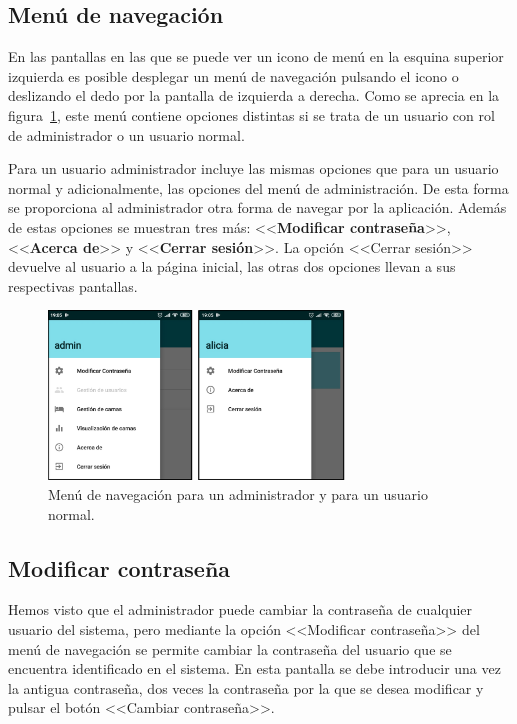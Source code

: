 \subsection{Menú de navegación}

En las pantallas en las que se puede ver un icono de menú en la esquina superior izquierda es posible desplegar un menú de navegación pulsando el icono o deslizando el dedo por la pantalla de izquierda a derecha. Como se aprecia en la figura~\ref{fig:menunavegacion}, este menú contiene opciones distintas si se trata de un usuario con rol de administrador o un usuario normal. 

Para un usuario administrador incluye las mismas opciones que para un usuario normal y adicionalmente, las opciones del menú de administración. De esta forma se proporciona al administrador otra forma de navegar por la aplicación. Además de estas opciones se muestran tres más: <<\textbf{Modificar contraseña}>>, <<\textbf{Acerca de}>> y <<\textbf{Cerrar sesión}>>. La opción <<Cerrar sesión>> devuelve al usuario a la página inicial, las otras dos opciones llevan a sus respectivas pantallas.  

\begin{figure}[H]
	\centering
	\includegraphics[width=0.7\textwidth]{../img/menunavegacion.png}
	\caption{Menú de navegación para un administrador y para un usuario normal.}
	\label{fig:menunavegacion}
\end{figure} 

\subsection{Modificar contraseña}

Hemos visto que el administrador puede cambiar la contraseña de cualquier usuario del sistema, pero mediante la opción <<Modificar contraseña>> del menú de navegación se permite cambiar la contraseña del usuario que se encuentra identificado en el sistema. En esta pantalla se debe introducir una vez la antigua contraseña, dos veces la contraseña por la que se desea modificar y pulsar el botón <<Cambiar contraseña>>. 

